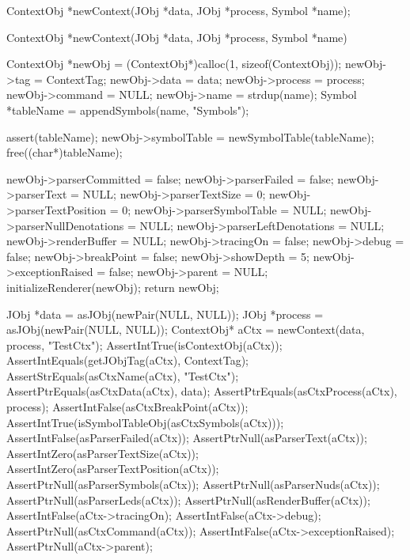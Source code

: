 \startTestSuite[newContext]

\startCHeader
ContextObj *newContext(JObj *data, JObj *process, Symbol *name);
\stopCHeader

\startCCode
ContextObj *newContext(JObj *data, JObj *process, Symbol *name) {
  ContextObj *newObj =
    (ContextObj*)calloc(1, sizeof(ContextObj));
  newObj->tag                   = ContextTag;
  newObj->data                  = data;
  newObj->process               = process;
  newObj->command               = NULL;
  newObj->name                  = strdup(name);
  Symbol *tableName             = appendSymbols(name, "Symbols");
  
  assert(tableName);
  newObj->symbolTable           = newSymbolTable(tableName);
  free((char*)tableName);
  
  newObj->parserCommitted       = false;
  newObj->parserFailed          = false;
  newObj->parserText            = NULL;
  newObj->parserTextSize        = 0;
  newObj->parserTextPosition    = 0;
  newObj->parserSymbolTable     = NULL;
  newObj->parserNullDenotations = NULL;
  newObj->parserLeftDenotations = NULL;
  newObj->renderBuffer          = NULL;
  newObj->tracingOn             = false;
  newObj->debug                 = false;
  newObj->breakPoint            = false;
  newObj->showDepth             = 5;
  newObj->exceptionRaised       = false;
  newObj->parent                = NULL;
  initializeRenderer(newObj);
  return newObj;
}
\stopCCode


\startCTest
  JObj *data       = asJObj(newPair(NULL, NULL));
  JObj *process    = asJObj(newPair(NULL, NULL));
  ContextObj* aCtx = newContext(data, process, "TestCtx");
  AssertIntTrue(isContextObj(aCtx));
  AssertIntEquals(getJObjTag(aCtx), ContextTag);
  AssertStrEquals(asCtxName(aCtx), "TestCtx");
  AssertPtrEquals(asCtxData(aCtx), data);
  AssertPtrEquals(asCtxProcess(aCtx), process);
  AssertIntFalse(asCtxBreakPoint(aCtx));
  AssertIntTrue(isSymbolTableObj(asCtxSymbols(aCtx)));
  AssertIntFalse(asParserFailed(aCtx));
  AssertPtrNull(asParserText(aCtx));
  AssertIntZero(asParserTextSize(aCtx));
  AssertIntZero(asParserTextPosition(aCtx));
  AssertPtrNull(asParserSymbols(aCtx));
  AssertPtrNull(asParserNuds(aCtx));
  AssertPtrNull(asParserLeds(aCtx));
  AssertPtrNull(asRenderBuffer(aCtx));
  AssertIntFalse(aCtx->tracingOn);
  AssertIntFalse(aCtx->debug);
  AssertPtrNull(asCtxCommand(aCtx));
  AssertIntFalse(aCtx->exceptionRaised);
  AssertPtrNull(aCtx->parent);
\stopCTest
\stopTestCase
\stopTestSuite

